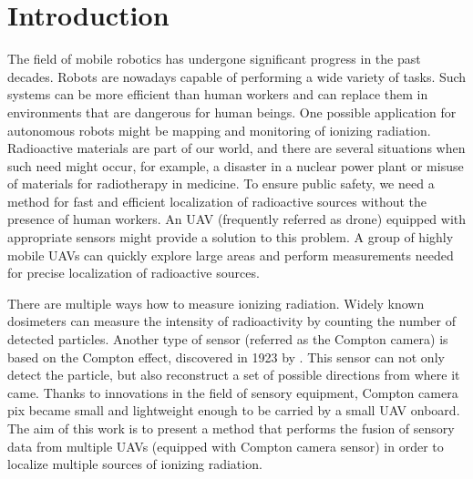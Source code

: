 \chapter{Introduction\label{chap:introduction}}
The field of mobile robotics has undergone significant progress in the past decades.
Robots are nowadays capable of performing a wide variety of tasks. 
Such systems can be more efficient than human workers and can replace them in environments that are dangerous for human beings.
One possible application for autonomous robots might be mapping and monitoring of ionizing radiation. 
Radioactive materials are part of our world, and there are several situations when such need might occur, for example, a disaster in a nuclear power plant or misuse of materials for radiotherapy in medicine. 
To ensure public safety, we need a method for fast and efficient localization of radioactive sources without the presence of human workers.
An \ac{UAV} (frequently referred as drone) equipped with appropriate sensors might provide a solution to this problem.
A group of highly mobile \ac{UAV}s can quickly explore large areas and perform measurements needed for precise localization of radioactive sources.


There are multiple ways how to measure ionizing radiation.
Widely known dosimeters can measure the intensity of radioactivity by counting the number of detected particles.
Another type of sensor (referred as the Compton camera) is based on the Compton effect, discovered in 1923 by \cite{compton}.
This sensor can not only detect the particle, but also reconstruct a set of possible directions from where it came.
Thanks to innovations in the field of sensory equipment, Compton camera \ac{pix} became small and lightweight enough to be carried by a small \ac{UAV} onboard.
The aim of this work is to present a method that performs the fusion of sensory data from multiple \ac{UAV}s (equipped with Compton camera sensor) in order to localize multiple sources of ionizing radiation.



